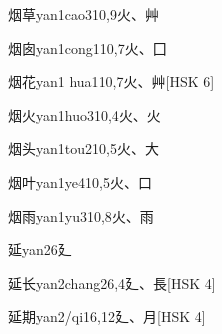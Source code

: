 \begin{EntryWithPhonetic}{烟草}{yan1cao3}{10,9}{⽕、⾋}
\end{EntryWithPhonetic}

\begin{EntryWithPhonetic}{烟囱}{yan1cong1}{10,7}{⽕、⼞}
\end{EntryWithPhonetic}

\begin{EntryWithPhonetic}{烟花}{yan1 hua1}{10,7}{⽕、⾋}[HSK 6]
\end{EntryWithPhonetic}

\begin{EntryWithPhonetic}{烟火}{yan1huo3}{10,4}{⽕、⽕}
\end{EntryWithPhonetic}

\begin{EntryWithPhonetic}{烟头}{yan1tou2}{10,5}{⽕、⼤}
\end{EntryWithPhonetic}

\begin{EntryWithPhonetic}{烟叶}{yan1ye4}{10,5}{⽕、⼝}
\end{EntryWithPhonetic}

\begin{EntryWithPhonetic}{烟雨}{yan1yu3}{10,8}{⽕、⾬}
\end{EntryWithPhonetic}

\begin{EntryWithPhonetic}{延}{yan2}{6}{⼵}
\end{EntryWithPhonetic}

\begin{EntryWithPhonetic}{延长}{yan2chang2}{6,4}{⼵、⾧}[HSK 4]
\end{EntryWithPhonetic}

\begin{EntryWithPhonetic}{延期}{yan2/qi1}{6,12}{⼵、⽉}[HSK 4]
\end{EntryWithPhonetic}

